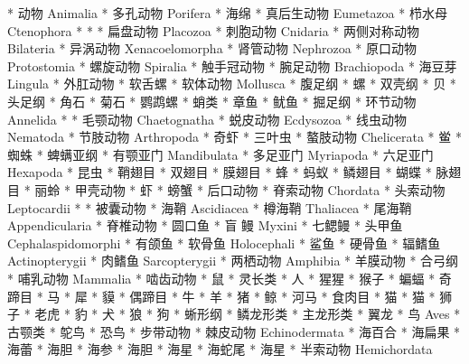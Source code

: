 		* 动物 Animalia
			* 多孔动物 Porifera
				* 海绵
			* 真后生动物 Eumetazoa
				* 栉水母 Ctenophora
				* 
					* 
						* 扁盘动物 Placozoa
						* 刺胞动物 Cnidaria
					* 两侧对称动物 Bilateria
						* 异涡动物 Xenacoelomorpha
						* 肾管动物 Nephrozoa
							* 原口动物 Protostomia
								* 螺旋动物 Spiralia
									* 触手冠动物
										* 腕足动物 Brachiopoda
											* 海豆芽 Lingula
										* 外肛动物
										* 软舌螺
									* 软体动物 Mollusca
										* 腹足纲
											* 螺
										* 双壳纲
											* 贝
										* 头足纲
											* 角石
												* 菊石
												* 鹦鹉螺
												* 蛸类
													* 章鱼
													* 鱿鱼
										* 掘足纲
									* 环节动物 Annelida
								* 
									* 毛颚动物 Chaetognatha
									* 蜕皮动物 Ecdysozoa
										* 线虫动物 Nematoda
										* 节肢动物 Arthropoda
											* 奇虾
											* 三叶虫
											* 螯肢动物 Chelicerata
												* 鲎
												* 蜘蛛
												* 蜱螨亚纲
											* 有颚亚门 Mandibulata
												* 多足亚门 Myriapoda
												* 六足亚门 Hexapoda
													* 昆虫
														* 鞘翅目
														* 双翅目
														* 膜翅目
															* 蜂
																* 蚂蚁
														* 鳞翅目
															* 蝴蝶
														* 脉翅目
															* 丽蛉
												* 甲壳动物
													* 虾
														* 螃蟹
							* 后口动物
								* 脊索动物 Chordata
									* 头索动物 Leptocardii
									*
										* 被囊动物
											*   海鞘 Ascidiacea
											* 樽海鞘 Thaliacea
											* 尾海鞘 Appendicularia
										* 脊椎动物
											* 圆口鱼
												* 盲  鳗 Myxini
												* 七鳃鳗
											* 头甲鱼 Cephalaspidomorphi
											* 有颌鱼
												* 软骨鱼 Holocephali
													* 鲨鱼
												* 硬骨鱼
													* 辐鳍鱼 Actinopterygii
													* 肉鳍鱼 Sarcopterygii
														* 两栖动物 Amphibia
														* 羊膜动物
															* 合弓纲
																* 哺乳动物 Mammalia
																	* 啮齿动物
																		* 鼠
																	* 灵长类
																		* 人
																		* 猩猩
																		* 猴子
																	* 蝙蝠
																	* 奇蹄目
																		* 马
																		* 犀
																		* 貘
																	* 偶蹄目
																		* 牛
																		* 羊
																		* 猪
																		* 鲸
																		* 河马
																	* 食肉目
																		* 猫
																			* 猫
																			* 狮子
																			* 老虎
																			* 豹
																		* 犬
																			* 狼
																			* 狗
															* 蜥形纲
																* 鳞龙形类
																* 主龙形类
																	* 翼龙
																	* 鸟 Aves
																		* 古颚类
																			* 鸵鸟
																			* 恐鸟
								* 步带动物
									* 棘皮动物 Echinodermata
										* 海百合
										* 海扁果
										* 海蕾
										* 海胆
											* 海参
											* 海胆
										* 海星
											* 海蛇尾
											* 海星
									* 半索动物 Hemichordata

